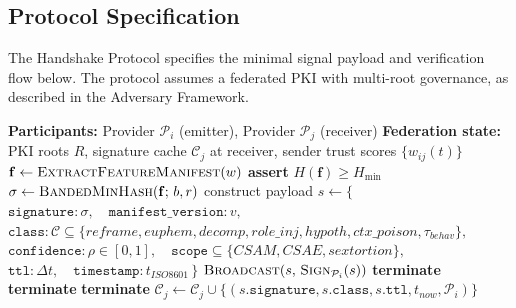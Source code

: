 \documentclass[11pt]{article}
\begin{document}
\subsection{Protocol Specification}
\label{sec:protocol}

The Handshake Protocol specifies the minimal signal payload and verification flow below. The protocol assumes a federated PKI with multi-root governance, as described in the Adversary Framework.

\begin{algorithm}[h]
\caption{Cross-Provider Handshake for Adversarial Intent Telemetry}
\label{alg:handshake}
\begin{algorithmic}[1]
\Statex \textbf{Participants:} Provider $\mathcal{P}_i$ (emitter), Provider $\mathcal{P}_j$ (receiver)
\Statex \textbf{Federation state:} PKI roots $R$, signature cache $\mathcal{C}_j$ at receiver, sender trust scores $\{w_{ij}(t)\}$
\Statex
{} 
    \State $\mathbf{f} \gets \textsc{ExtractFeatureManifest}(w)$ 
    \State \textbf{assert} $H(\mathbf{f}) \geq H_{\min}$ 
    \State $\sigma \gets \textsc{BandedMinHash}(\mathbf{f};\, b, r)$ 
    \State construct payload
    \Statex \quad $s \gets \big\{\,$
    \Statex \qquad $\texttt{signature} : \sigma,\quad \texttt{manifest\_version} : v,$
    \Statex \qquad $\texttt{class} : \mathcal{C} \subseteq \{\mathit{reframe}, \mathit{euphem}, \mathit{decomp}, \mathit{role\_inj}, \mathit{hypoth}, \mathit{ctx\_poison}, \tau_\mathit{behav}\},$
    \Statex \qquad $\texttt{confidence} : \rho \in [0,1],\quad \texttt{scope} \subseteq \{\mathit{CSAM}, \mathit{CSAE}, \mathit{sextortion}\},$
    \Statex \qquad $\texttt{ttl} : \Delta t,\quad \texttt{timestamp} : t_\mathit{ISO8601}\,\big\}$
    \State \Return $\textsc{Broadcast}(s,\, \textsc{Sign}_{\mathcal{P}_i}(s))$
\EndProcedure
\Statex
{}
     \textbf{terminate} \EndIf
     \textbf{terminate} \EndIf
     \textbf{terminate} \EndIf
    \State $\mathcal{C}_j \gets \mathcal{C}_j \cup \{(s.\texttt{signature}, s.\texttt{class}, s.\texttt{ttl}, t_\mathit{now}, \mathcal{P}_i)\}$
\EndProcedure

\end{algorithmic}
\end{algorithm}
\end{document}
